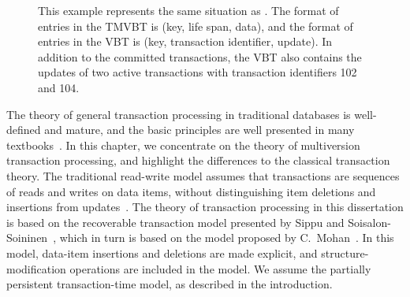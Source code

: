 \begin{figure}[htb]
\begin{center}
  
  {This example represents the same situation as
  .
  The format of entries in the TMVBT is (key, life span, data), and the
  format of entries in the VBT is (key, transaction identifier, update).
  In addition to the committed transactions, the VBT also contains the
  updates of two active transactions with transaction identifiers \num{102}
  and \num{104}.}
  \label{fig:cmvbt-contents}
\end{center}
\end{figure}

The theory of general transaction processing in traditional 
databases is well-defined and mature, and the basic principles are
well presented in many
textbooks~\cite{bernstein:1987:cc-n-r,gray:1993:transactionprocessing,papadimitriou:1986:cc-theory}.
In this chapter, we concentrate on the theory of multiversion
transaction processing, and highlight the differences to the classical
transaction theory.
The traditional read-write model assumes that transactions are sequences
of reads and writes on data items, without distinguishing item deletions and
insertions from
updates~\cite{bernstein:1987:cc-n-r,papadimitriou:1986:cc-theory}.
The theory of transaction processing in this dissertation is based on
the recoverable transaction model presented by Sippu and
Soisalon-Soininen~\cite{sippu:2001:theory}, which in turn is based on the
model proposed by C.~Mohan~\cite{mohan:1990:aries-kvl,mohan:1992:aries-im}.
In this model, data-item insertions and deletions are made explicit,
and structure-modification operations are included in the model.
We assume the partially persistent transaction-time model, as
described in the introduction.
